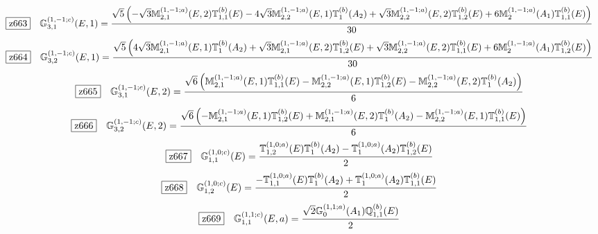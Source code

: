 \documentclass[fleqn,10pt,landscape]{jsarticle}
\begin{document}
\begin{dmath*}
\hspace*{3mm}\fbox{z663}\quad \mathbb{G}_{3,1}^{(1,-1;c)}(E,1)=\frac{\sqrt{5} \left(- \sqrt{3} \mathbb{M}_{2,1}^{(1,-1;a)}(E,2) \mathbb{T}_{1,1}^{(b)}(E) - 4 \sqrt{3} \mathbb{M}_{2,2}^{(1,-1;a)}(E,1) \mathbb{T}_{1}^{(b)}(A_{2}) + \sqrt{3} \mathbb{M}_{2,2}^{(1,-1;a)}(E,2) \mathbb{T}_{1,2}^{(b)}(E) + 6 \mathbb{M}_{2}^{(1,-1;a)}(A_{1}) \mathbb{T}_{1,1}^{(b)}(E)\right)}{30}
\end{dmath*}
\begin{dmath*}
\hspace*{3mm}\fbox{z664}\quad \mathbb{G}_{3,2}^{(1,-1;c)}(E,1)=\frac{\sqrt{5} \left(4 \sqrt{3} \mathbb{M}_{2,1}^{(1,-1;a)}(E,1) \mathbb{T}_{1}^{(b)}(A_{2}) + \sqrt{3} \mathbb{M}_{2,1}^{(1,-1;a)}(E,2) \mathbb{T}_{1,2}^{(b)}(E) + \sqrt{3} \mathbb{M}_{2,2}^{(1,-1;a)}(E,2) \mathbb{T}_{1,1}^{(b)}(E) + 6 \mathbb{M}_{2}^{(1,-1;a)}(A_{1}) \mathbb{T}_{1,2}^{(b)}(E)\right)}{30}
\end{dmath*}
\begin{dmath*}
\hspace*{3mm}\fbox{z665}\quad \mathbb{G}_{3,1}^{(1,-1;c)}(E,2)=\frac{\sqrt{6} \left(\mathbb{M}_{2,1}^{(1,-1;a)}(E,1) \mathbb{T}_{1,1}^{(b)}(E) - \mathbb{M}_{2,2}^{(1,-1;a)}(E,1) \mathbb{T}_{1,2}^{(b)}(E) - \mathbb{M}_{2,2}^{(1,-1;a)}(E,2) \mathbb{T}_{1}^{(b)}(A_{2})\right)}{6}
\end{dmath*}
\begin{dmath*}
\hspace*{3mm}\fbox{z666}\quad \mathbb{G}_{3,2}^{(1,-1;c)}(E,2)=\frac{\sqrt{6} \left(- \mathbb{M}_{2,1}^{(1,-1;a)}(E,1) \mathbb{T}_{1,2}^{(b)}(E) + \mathbb{M}_{2,1}^{(1,-1;a)}(E,2) \mathbb{T}_{1}^{(b)}(A_{2}) - \mathbb{M}_{2,2}^{(1,-1;a)}(E,1) \mathbb{T}_{1,1}^{(b)}(E)\right)}{6}
\end{dmath*}
\begin{dmath*}
\hspace*{3mm}\fbox{z667}\quad \mathbb{G}_{1,1}^{(1,0;c)}(E)=\frac{\mathbb{T}_{1,2}^{(1,0;a)}(E) \mathbb{T}_{1}^{(b)}(A_{2}) - \mathbb{T}_{1}^{(1,0;a)}(A_{2}) \mathbb{T}_{1,2}^{(b)}(E)}{2}
\end{dmath*}
\begin{dmath*}
\hspace*{3mm}\fbox{z668}\quad \mathbb{G}_{1,2}^{(1,0;c)}(E)=\frac{- \mathbb{T}_{1,1}^{(1,0;a)}(E) \mathbb{T}_{1}^{(b)}(A_{2}) + \mathbb{T}_{1}^{(1,0;a)}(A_{2}) \mathbb{T}_{1,1}^{(b)}(E)}{2}
\end{dmath*}
\begin{dmath*}
\hspace*{3mm}\fbox{z669}\quad \mathbb{G}_{1,1}^{(1,1;c)}(E,a)=\frac{\sqrt{2} \mathbb{G}_{0}^{(1,1;a)}(A_{1}) \mathbb{Q}_{1,1}^{(b)}(E)}{2}
\end{dmath*}
\end{document}
